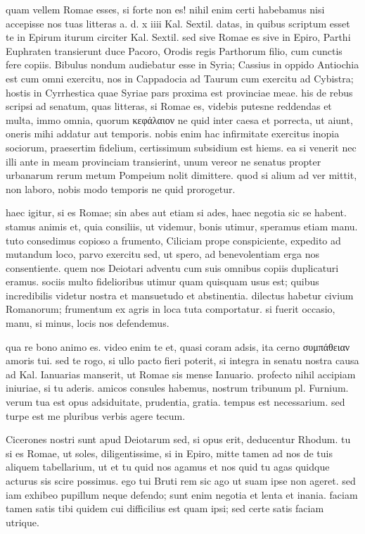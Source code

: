 


 quam vellem Romae esses, si forte non es! nihil enim certi habebamus nisi accepisse nos tuas litteras a. d. x iiii Kal. Sextil. datas, in quibus scriptum esset te in Epirum iturum circiter Kal. Sextil. sed sive Romae es sive in Epiro, Parthi Euphraten transierunt duce Pacoro, Orodis regis Parthorum filio, cum cunctis fere copiis. Bibulus nondum audiebatur esse in Syria; Cassius in oppido Antiochia est cum omni exercitu, nos in Cappadocia ad Taurum cum exercitu ad Cybistra; hostis in Cyrrhestica quae Syriae pars proxima est provinciae meae. his de rebus scripsi ad senatum, quas litteras, si Romae es, videbis putesne reddendas et multa, immo omnia, quorum κεφάλαιον ne quid inter caesa et porrecta, ut aiunt, oneris mihi addatur aut temporis. nobis enim hac infirmitate exercitus inopia sociorum, praesertim fidelium, certissimum subsidium est hiems. ea si venerit nec illi ante in meam provinciam transierint, unum vereor ne senatus propter urbanarum rerum metum Pompeium nolit dimittere. quod si alium ad ver mittit, non laboro, nobis modo temporis ne quid prorogetur.

 haec igitur, si es Romae; sin abes aut etiam si ades, haec negotia sic se habent. stamus animis et, quia consiliis, ut videmur, bonis utimur, speramus etiam manu. tuto consedimus copioso a frumento, Ciliciam prope conspiciente, expedito ad mutandum loco, parvo exercitu sed, ut spero, ad benevolentiam erga nos consentiente. quem nos Deiotari adventu cum suis omnibus copiis duplicaturi eramus. sociis multo fidelioribus utimur quam quisquam usus est; quibus incredibilis videtur nostra et mansuetudo et abstinentia. dilectus habetur civium Romanorum; frumentum ex agris in loca tuta comportatur. si fuerit occasio, manu, si minus, locis nos defendemus.

 qua re bono animo es. video enim te et, quasi coram adsis, ita cerno συμπάθειαν amoris tui. sed te rogo, si ullo pacto fieri poterit, si integra in senatu nostra causa ad Kal. Ianuarias manserit, ut Romae sis mense Ianuario. profecto nihil accipiam iniuriae, si tu aderis. amicos consules habemus, nostrum tribunum pl. Furnium. verum tua est opus adsiduitate, prudentia, gratia. tempus est necessarium. sed turpe est me pluribus verbis agere tecum.

 Cicerones nostri sunt apud Deiotarum sed, si opus erit, deducentur Rhodum. tu si es Romae, ut soles, diligentissime, si in Epiro, mitte tamen ad nos de tuis aliquem tabellarium, ut et tu quid nos agamus et nos quid tu agas quidque acturus sis scire possimus. ego tui Bruti rem sic ago ut suam ipse non ageret. sed iam exhibeo pupillum neque defendo; sunt enim negotia et lenta et inania. faciam tamen satis tibi quidem cui difficilius est quam ipsi; sed certe satis faciam utrique.
